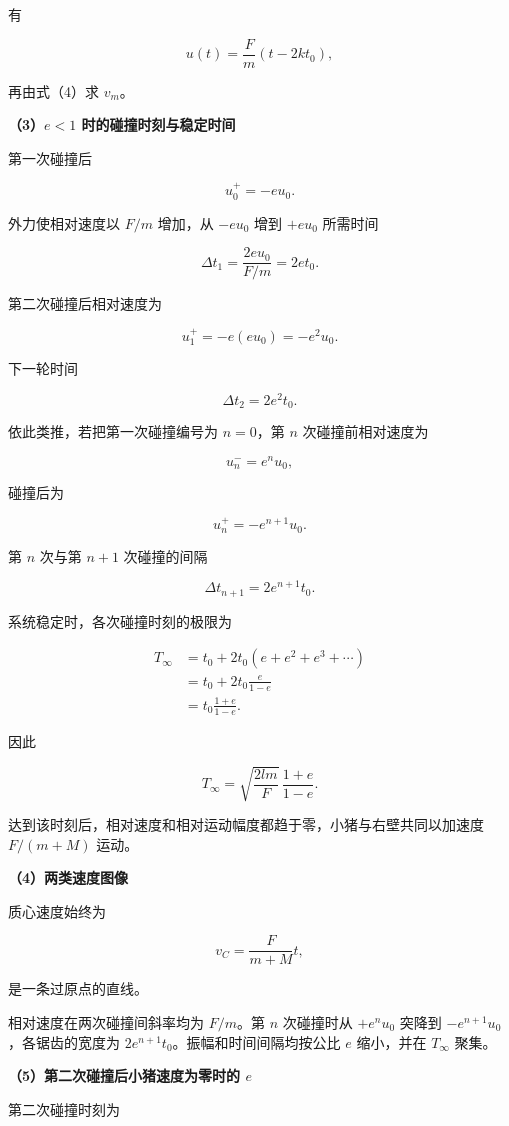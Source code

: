 \documentclass[12pt,a4paper,UTF8]{ctexart}
\begin{document}
有

\[
u(t)=\frac Fm(t-2kt_0),
\tag{12}
\]

再由式（4）求 \(v_m\)。

\textbf{（3）\(e<1\) 时的碰撞时刻与稳定时间}

第一次碰撞后

\[
u_0^+=-eu_0.
\]

外力使相对速度以 \(F/m\) 增加，从 \(-eu_0\) 增到 \(+eu_0\) 所需时间

\[
\Delta t_1
=\frac{2eu_0}{F/m}
=2et_0.
\tag{13}
\]

第二次碰撞后相对速度为

\[
u_1^+=-e(eu_0)=-e^2u_0.
\]

下一轮时间

\[
\Delta t_2=2e^2t_0.
\]

依此类推，若把第一次碰撞编号为 \(n=0\)，第 \(n\) 次碰撞前相对速度为

\[
u_n^-=e^nu_0,
\tag{14}
\]

碰撞后为

\[
u_n^+=-e^{n+1}u_0.
\tag{15}
\]

第 \(n\) 次与第 \(n+1\) 次碰撞的间隔

\[
\Delta t_{n+1}=2e^{n+1}t_0.
\tag{16}
\]

系统稳定时，各次碰撞时刻的极限为

\[
\begin{aligned}
T_\infty
&=t_0+2t_0(e+e^2+e^3+\cdots)\\
&=t_0+2t_0\frac e{1-e}\\
&=t_0\frac{1+e}{1-e}.
\end{aligned}
\]

因此

\[
\boxed{
T_\infty
=\sqrt{\frac{2lm}{F}}\,
\frac{1+e}{1-e}
}.
\tag{17}
\]

达到该时刻后，相对速度和相对运动幅度都趋于零，小猪与右壁共同以加速度
\(F/(m+M)\) 运动。

\textbf{（4）两类速度图像}

质心速度始终为

\[
\boxed{v_C=\frac{F}{m+M}t},
\tag{18}
\]

是一条过原点的直线。

相对速度在两次碰撞间斜率均为 \(F/m\)。第 \(n\) 次碰撞时从 \(+e^nu_0\)
突降到 \(-e^{n+1}u_0\)，各锯齿的宽度为
\(2e^{n+1}t_0\)。振幅和时间间隔均按公比 \(e\) 缩小，并在 \(T_\infty\)
聚集。

\textbf{（5）第二次碰撞后小猪速度为零时的 \(e\)}

第二次碰撞时刻为
\end{document}
